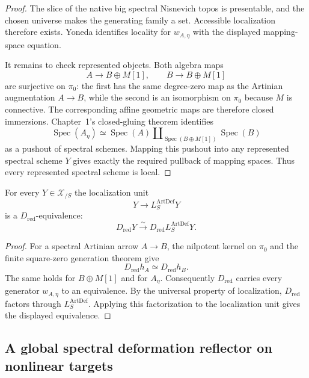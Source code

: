 \begin{proof}
The slice of the native big spectral Nisnevich topos is presentable, and the
chosen universe makes the generating family a set.  Accessible localization
therefore exists.  Yoneda identifies locality for $w_{A,\eta}$ with the
displayed mapping-space equation.

It remains to check represented objects.  Both algebra maps
\[
    A\longrightarrow B\oplus M[1],
    \qquad
    B\longrightarrow B\oplus M[1]
\]
are surjective on $\pi_0$: the first has the same degree-zero map as the
Artinian augmentation $A\to B$, while the second is an isomorphism on
$\pi_0$ because $M$ is connective.  The corresponding affine geometric maps
are therefore closed immersions.  Chapter~1's closed-gluing theorem identifies
\[
\boxed{
    \operatorname{Spec}(A_\eta)
    \simeq
    \operatorname{Spec}(A)
    \amalg_{\operatorname{Spec}(B\oplus M[1])}
    \operatorname{Spec}(B)}
\]
as a pushout of spectral schemes.  Mapping this pushout into any represented
spectral scheme $Y$ gives exactly the required pullback of mapping spaces.
Thus every represented spectral scheme is local.
\end{proof}

\begin{proposition}
\label{prop:bnla-artdef-dred-equivalence}
For every $Y\in\mathcal X_{/S}$ the localization unit
\[
    Y\longrightarrow L^{\mathrm{ArtDef}}_S Y
\]
is a $D_{\mathrm{red}}$-equivalence:
\[
\boxed{
    D_{\mathrm{red}}Y
    \xrightarrow{\sim}
    D_{\mathrm{red}}L^{\mathrm{ArtDef}}_S Y.}
\]
\end{proposition}

\begin{proof}
For a spectral Artinian arrow $A\to B$, the nilpotent kernel on $\pi_0$ and
the finite square-zero generation theorem give
\[
    D_{\mathrm{red}}h_A
    \simeq
    D_{\mathrm{red}}h_B.
\]
The same holds for $B\oplus M[1]$ and for $A_\eta$.  Consequently
$D_{\mathrm{red}}$ carries every generator
$w_{A,\eta}$ to an equivalence.  By the universal property of localization,
$D_{\mathrm{red}}$ factors through $L^{\mathrm{ArtDef}}_S$.  Applying this
factorization to the localization unit gives the displayed equivalence.
\end{proof}


\subsection{A global spectral deformation reflector on nonlinear targets}
\label{sec:bnla-global-def-reflector}

